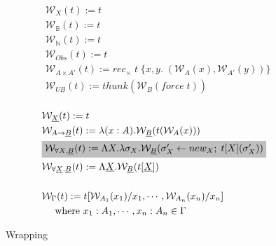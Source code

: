 \documentclass[acmsmall]{acmart}
\begin{document}
\begin{figure}[H]
  \centering
  \scriptsize
  \begin{minipage}[t]{0.48\textwidth}
    \[
    \begin{aligned}
      &\mathcal{W} _X(t) := t \\
      &\mathcal{W} _\mathbb{B}(t) := t \\
      &\mathcal{W} _\mathbb{N}(t) := t \\
      &\mathcal{W} _{Obs}(t) := t \\
      &\mathcal{W} _{A \times A'}(t) := rec_\times \;t\;\{x,y.\; (\mathcal{W} _A(x),\mathcal{W} _{A'}(y))\} \\
      &\mathcal{W}_{U\underline{B}}(t) := thunk(\mathcal{W} _{\underline{B}}(force\;t)) \\
    \end{aligned}
    \]
  \end{minipage}\hspace{2em}%
  \begin{minipage}[t]{0.48\textwidth}
    \[
    \begin{aligned}
      &\mathcal{W}_{\underline{X}}(t) := t\\
      &\mathcal{W} _{A \rightarrow \underline{B}}(t) := \lambda(x:A).\mathcal{W}_{\underline{B}}(t(\mathcal{W}_A(x))) \\
      &\colorbox{lightgray}{$\mathcal{W}_{\forall X.\underline{B}}(t) := 
      \Lambda X.\lambda \sigma_X.  \mathcal{W}_{\underline{B}}(\sigma_X'\leftarrow new_X;\;t[X](\sigma_X'))$} \\
      &\mathcal{W}_{\forall \underline{X}.\underline{B}}(t) := \Lambda \underline{X}.\mathcal{W}_{\underline{B}}(t[\underline{X}]) \\\\
      &\mathcal{W}_\Gamma(t) := t[\mathcal{W}_{A_1}(x_1)/x_1,\cdots,\mathcal{W}_{A_n}(x_n)/x_n] \\
      &\quad \text{ where } x_1:A_1,\cdots,x_n:A_n \in \Gamma
    \end{aligned}
    \]
  \end{minipage}
  \caption{Wrapping}
  \label{fig:wrapping}
\end{figure}
\end{document}
